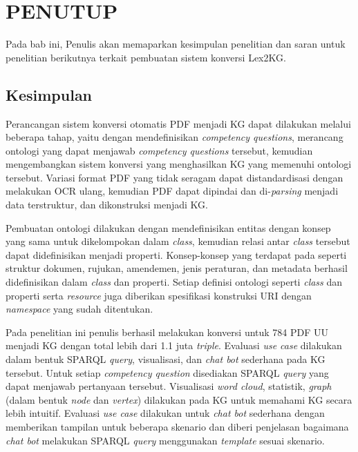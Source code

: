 \chapter{PENUTUP}
\label{chap:6}
Pada bab ini, Penulis akan memaparkan kesimpulan penelitian dan saran untuk penelitian berikutnya
terkait pembuatan sistem konversi Lex2KG.

\section{Kesimpulan}
\label{sec:kesimpulan}
Perancangan sistem konversi otomatis PDF \legal menjadi KG dapat dilakukan melalui beberapa tahap,
yaitu dengan mendefinisikan \textit{competency questions}, merancang ontologi yang dapat menjawab
\textit{competency questions} tersebut, kemudian mengembangkan sistem konversi yang menghasilkan KG
yang memenuhi ontologi tersebut. Variasi format PDF yang tidak seragam dapat distandardisasi dengan
melakukan OCR ulang, kemudian PDF dapat dipindai dan di-\textit{parsing} menjadi data terstruktur,
dan dikonstruksi menjadi KG.

Pembuatan ontologi dilakukan dengan mendefinisikan entitas dengan konsep yang sama untuk
dikelompokan dalam \textit{class}, kemudian relasi antar \textit{class} tersebut dapat didefinisikan
menjadi properti. Konsep-konsep yang terdapat pada \legal seperti struktur dokumen, rujukan,
amendemen, jenis peraturan, dan metadata berhasil didefinisikan dalam \textit{class} dan properti. Setiap definisi
ontologi seperti \textit{class} dan properti serta \textit{resource} juga diberikan spesifikasi
konstruksi URI dengan \textit{namespace} yang sudah ditentukan.

Pada penelitian ini penulis berhasil melakukan konversi untuk 784 PDF UU menjadi KG dengan total
lebih dari 1.1 juta \textit{triple}. Evaluasi \textit{use case} dilakukan dalam bentuk SPARQL
\textit{query}, visualisasi, dan \textit{chat bot} sederhana pada KG tersebut. Untuk setiap
\textit{competency question} disediakan SPARQL \textit{query} yang dapat menjawab pertanyaan
tersebut. Visualisasi \textit{word cloud}, statistik, \textit{graph} (dalam bentuk \textit{node} dan
\textit{vertex}) dilakukan pada KG untuk memahami KG secara lebih intuitif. Evaluasi \textit{use
	case} dilakukan untuk \textit{chat bot} sederhana dengan memberikan tampilan untuk beberapa skenario
dan diberi penjelasan bagaimana \textit{chat bot} melakukan SPARQL \textit{query} menggunakan
\textit{template} sesuai skenario.

